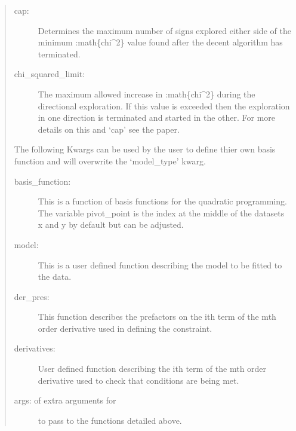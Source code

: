 \documentclass[letterpaper,10pt,english]{sphinxmanual}
\begin{document}
\begin{fulllineitems}
\begin{quote}
\begin{description}
\item[{cap: }] \leavevmode
Determines the maximum number of signs explored either side of the
minimum :math\textasciigrave{}\{chi\textasciicircum{}2\}\textasciigrave{} value found after the decent algorithm
has terminated.

\item[{chi\_squared\_limit: }] \leavevmode
The maximum allowed increase in :math\textasciigrave{}\{chi\textasciicircum{}2\}\textasciigrave{} during the
directional exploration. If this value is exceeded then the
exploration in one direction is terminated and started in the other.
For more details on this and ‘cap’ see the  paper.

\end{description}

The following Kwargs can be used by the user to define thier own basis
function and will overwrite the ‘model\_type’ kwarg.
\begin{description}
\item[{basis\_function: }] \leavevmode
{} This is a function of basis functions
for the quadratic programming. The variable pivot\_point is the
index at the middle of the datasets x and y by default but can
be adjusted.

\item[{model: }] \leavevmode
{} This is
a user defined function describing the model to be fitted to the
data.

\item[{der\_pres: }] \leavevmode
{}
This function describes the prefactors on the ith term of the mth
order derivative used in defining the constraint.

\item[{derivatives: }] \leavevmode
{}
User defined function describing the ith term of the mth
order derivative used to check that conditions are being met.

\item[{args:  of extra arguments for }] \leavevmode
to pass to the functions detailed above.


\end{description}
\end{quote}
\end{fulllineitems}
\end{document}
